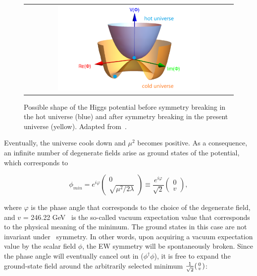 \begin{figure}[tbh!]
 \begin{center}
 \begin{tabular}{c}
 \includegraphics[width=0.7\textwidth]{figures/Part1/SM/HiggsPotential}
 \end{tabular}
 \caption{Possible shape of the Higgs potential before symmetry breaking in the hot universe (blue) and after symmetry breaking in the present universe (yellow). Adapted from~\cite{universe9040178}.}
 \label{fig:HiggsPotential}
 \end{center}
\end{figure}

Eventually, the universe cools down and $\mu^2$ becomes positive. As a consequence, an infinite number of degenerate fields arise as ground states of the potential, which corresponds to 

\begin{equation}
\phi_{min}=e^{i\varphi}\begin{pmatrix}0\\\sqrt{\mu^2/2\lambda}\end{pmatrix}\equiv\frac{e^{i\varphi}}{\sqrt{2}}\begin{pmatrix}0\\v\end{pmatrix},
\end{equation}

where $\varphi$ is the phase angle that corresponds to the choice of the degenerate field, and $v$ = 246.22 GeV~\cite{ParticleDataGroup:2022pth} is the so-called vacuum expectation value that corresponds to the physical meaning of the minimum. The ground states in this case are not invariant under \ew~symmetry. In other words, upon acquiring a vacuum expectation value by the scalar field $\phi$, the \ac{EW} symmetry will be spontaneously broken. Since the phase angle will eventually cancel out in ($\phi^{\dagger}\phi$), it is free to expand the ground-state field around the arbitrarily selected minimum $\frac{1}{\sqrt{2}}\begin{psmallmatrix}0\\v\end{psmallmatrix}$:

